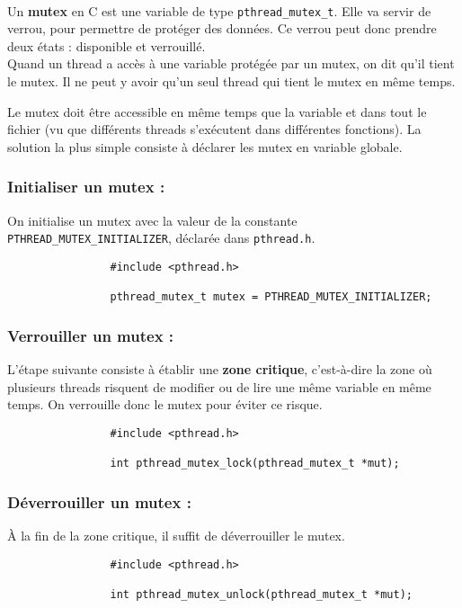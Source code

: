 		\paragraph{} Un \textbf{mutex} en C est une variable de type \lstinline!pthread_mutex_t!. Elle va servir de verrou, pour permettre de protéger des données. Ce verrou peut donc prendre deux états : disponible et verrouillé.\\
		Quand un thread a accès à une variable protégée par un mutex, on dit qu'il tient le mutex. Il ne peut y avoir qu'un seul thread qui tient le mutex en même temps.
		
		Le mutex doit être accessible en même temps que la variable et dans tout le fichier (vu que différents threads s'exécutent dans différentes fonctions). La solution la plus simple consiste à déclarer les mutex en variable globale.

		\subsubsection*{Initialiser un mutex :}
			On initialise un mutex avec la valeur de la constante \lstinline!PTHREAD_MUTEX_INITIALIZER!, déclarée dans \lstinline!pthread.h!.
			\begin{lstlisting}
				#include <pthread.h>

				pthread_mutex_t mutex = PTHREAD_MUTEX_INITIALIZER;
			\end{lstlisting}

		\subsubsection*{Verrouiller un mutex :}
			L'étape suivante consiste à établir une \textbf{zone critique}, c'est-à-dire la zone où plusieurs threads risquent de modifier ou de lire une même variable en même temps. On verrouille donc le mutex pour éviter ce risque.
			\begin{lstlisting}
				#include <pthread.h>

				int pthread_mutex_lock(pthread_mutex_t *mut);
			\end{lstlisting}

		\subsubsection*{Déverrouiller un mutex :}
			À la fin de la zone critique, il suffit de déverrouiller le mutex.
			\begin{lstlisting}
				#include <pthread.h>

				int pthread_mutex_unlock(pthread_mutex_t *mut);
			\end{lstlisting}

